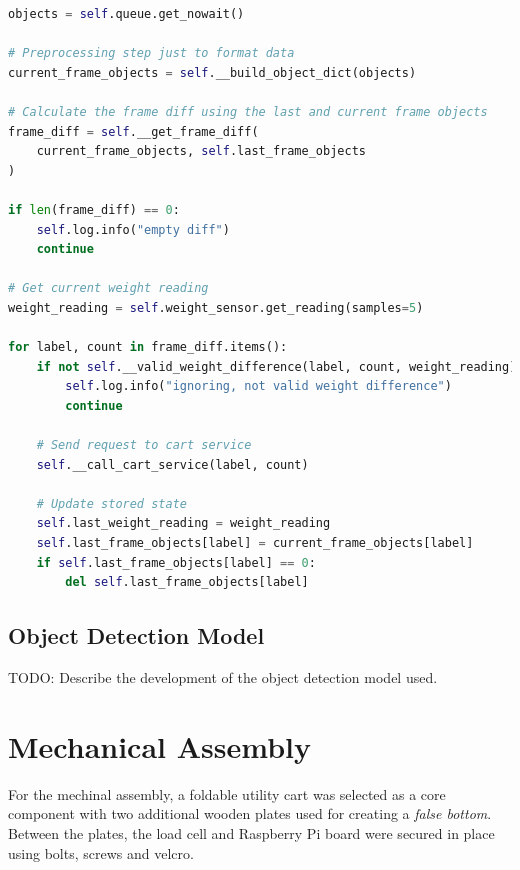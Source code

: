 \documentclass[openright]{normas-utf-tex} %
\begin{document}
\begin{lstlisting}[language=Python,caption={Product Recognizer thread logic}]
objects = self.queue.get_nowait()

# Preprocessing step just to format data
current_frame_objects = self.__build_object_dict(objects)

# Calculate the frame diff using the last and current frame objects
frame_diff = self.__get_frame_diff(
    current_frame_objects, self.last_frame_objects
)

if len(frame_diff) == 0:
    self.log.info("empty diff")
    continue

# Get current weight reading
weight_reading = self.weight_sensor.get_reading(samples=5)

for label, count in frame_diff.items():
    if not self.__valid_weight_difference(label, count, weight_reading):
        self.log.info("ignoring, not valid weight difference")
        continue

    # Send request to cart service
    self.__call_cart_service(label, count)

    # Update stored state
    self.last_weight_reading = weight_reading
    self.last_frame_objects[label] = current_frame_objects[label]
    if self.last_frame_objects[label] == 0:
        del self.last_frame_objects[label]
\end{lstlisting}

\subsection{Object Detection Model}

TODO: Describe the development of the object detection model used.

\section{Mechanical Assembly}

For the mechinal assembly, a foldable utility cart was selected as a core
component with two additional wooden plates used for creating a \textit{false
bottom}. Between the plates, the load cell and Raspberry Pi board were secured
in place using bolts, screws and velcro.
\end{document}
